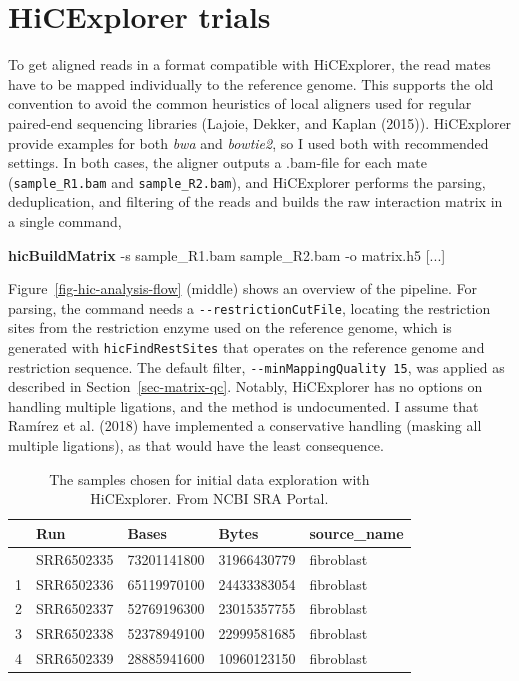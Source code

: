 \documentclass[
  11pt,
  a4paper,
]{scrbook}
\newenvironment{Shaded}{\begin{snugshade}}{\end{snugshade}}
\newcommand{\AttributeTok}[1]{\textcolor[rgb]{0.00,0.34,0.68}{#1}}
\newcommand{\ExtensionTok}[1]{\textcolor[rgb]{0.00,0.58,1.00}{\textbf{#1}}}
\newcommand{\NormalTok}[1]{\textcolor[rgb]{0.12,0.11,0.11}{#1}}
\newcommand{\PreprocessorTok}[1]{\textcolor[rgb]{0.00,0.43,0.16}{#1}}
\newcommand{\SpecialStringTok}[1]{\textcolor[rgb]{1.00,0.33,0.00}{#1}}
\renewenvironment{Shaded}
{
  \vspace{-0.5em} %
  \begin{snugshade} %
  \small %
}
{
  \end{snugshade} %
  \vspace{-1em} %
}
\begin{document}
\section{HiCExplorer trials}\label{hicexplorer-trials}

To get aligned reads in a format compatible with HiCExplorer, the read
mates have to be mapped individually to the reference genome. This
supports the old convention to avoid the common heuristics of local
aligners used for regular paired-end sequencing libraries (Lajoie,
Dekker, and Kaplan (2015)). HiCExplorer provide examples for both
\emph{bwa} and \emph{bowtie2}, so I used both with recommended settings.
In both cases, the aligner outputs a .bam-file for each mate
(\texttt{sample\_R1.bam} and \texttt{sample\_R2.bam}), and HiCExplorer
performs the parsing, deduplication, and filtering of the reads and
builds the raw interaction matrix in a single command,

\begin{Shaded}
\begin{Highlighting}[]
\ExtensionTok{hicBuildMatrix} \AttributeTok{{-}s}\NormalTok{ sample\_R1.bam sample\_R2.bam }\AttributeTok{{-}o}\NormalTok{ matrix.h5 }\PreprocessorTok{[}\SpecialStringTok{...}\PreprocessorTok{]}
\end{Highlighting}
\end{Shaded}

Figure~\ref{fig-hic-analysis-flow} (middle) shows an overview of the
pipeline. For parsing, the command needs a
\texttt{-\/-restrictionCutFile}, locating the restriction sites from the
restriction enzyme used on the reference genome, which is generated with
\texttt{hicFindRestSites} that operates on the reference genome and
restriction sequence. The default filter,
\texttt{-\/-minMappingQuality\ 15}, was applied as described in
Section~\ref{sec-matrix-qc}. Notably, HiCExplorer has no options on
handling multiple ligations, and the method is undocumented. I assume
that Ramírez et al. (2018) have implemented a conservative handling
(masking all multiple ligations), as that would have the least
consequence.

\begin{longtable}[]{@{}lllll@{}}

\caption{\label{tbl-hic-exploration}The samples chosen for initial data
exploration with HiCExplorer. From NCBI SRA Portal.}

\tabularnewline

\toprule\noalign{}
& Run & Bases & Bytes & source\_name \\
\midrule\noalign{}
\endhead
\bottomrule\noalign{}
\endlastfoot
0 & SRR6502335 & 73201141800 & 31966430779 & fibroblast \\
1 & SRR6502336 & 65119970100 & 24433383054 & fibroblast \\
2 & SRR6502337 & 52769196300 & 23015357755 & fibroblast \\
3 & SRR6502338 & 52378949100 & 22999581685 & fibroblast \\
4 & SRR6502339 & 28885941600 & 10960123150 & fibroblast \\

\end{longtable}
\end{document}
